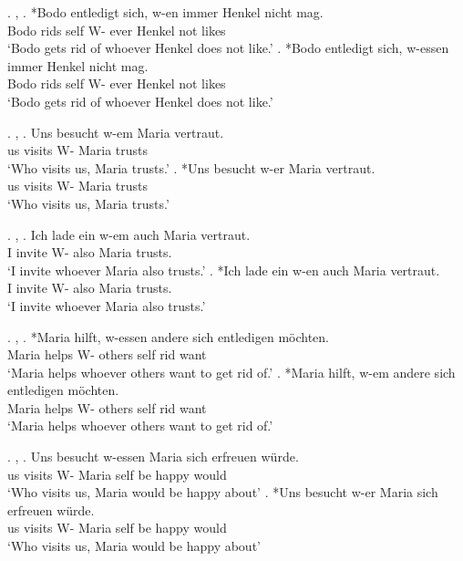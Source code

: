 \ex. , 
\ag. *Bodo entledigt sich, w-en immer Henkel nicht mag.\\
 Bodo rids\scsub{[gen]} self W- ever Henkel not likes\scsub{[acc]}\\
 `Bodo gets rid of whoever Henkel does not like.' \hfill \citep[344]{vogel2001}
\bg. *Bodo entledigt sich, w-essen immer Henkel nicht mag.\\
 Bodo rids\scsub{[gen]} self  W- ever Henkel not likes\scsub{[acc]}\\
 `Bodo gets rid of whoever Henkel does not like.' \hfill \citep[344]{vogel2001}

\ex. , 
\ag. Uns besucht w-em Maria vertraut.\\
 us visits\scsub{[nom]} W- Maria trusts\scsub{[dat]}\\
 `Who visits us, Maria trusts.' \hfill \citep[343]{vogel2001}
\bg. *Uns besucht w-er Maria vertraut.\\
 us visits\scsub{[nom]} W- Maria trusts\scsub{[dat]}\\
 `Who visits us, Maria trusts.' \hfill \citep[343]{vogel2001}

\ex. , 
\ag. Ich {lade ein} w-em auch Maria vertraut. \\
 I invite\scsub{[acc]} W- also Maria trusts\scsub{[dat]}.\\
 `I invite whoever Maria also trusts.' \hfill \citep[344]{vogel2001}
\bg. *Ich {lade ein} w-en auch Maria vertraut. \\
 I invite\scsub{[acc]} W- also Maria trusts\scsub{[dat]}.\\
 `I invite whoever Maria also trusts.' \hfill \citep[344]{vogel2001}

\ex. , 
\ag. *Maria hilft, w-essen andere sich entledigen möchten.\\
 Maria helps\scsub{[dat]} W- others self rid\scsub{[gen]} want\\
 `Maria helps whoever others want to get rid of.' \hfill \citep[344]{vogel2001}
\bg. *Maria hilft, w-em andere sich entledigen möchten.\\
 Maria helps\scsub{[dat]} W- others self rid\scsub{[gen]} want\\
 `Maria helps whoever others want to get rid of.' \hfill \citep[344]{vogel2001}

\ex. , 
\ag. Uns besucht w-essen Maria sich erfreuen würde.\\
 us visits\scsub{[nom]} W- Maria self {be happy}\scsub{[gen]} would\\
 `Who visits us, Maria would be happy about' \hfill \citep[343]{vogel2001}
\bg. *Uns besucht w-er Maria sich erfreuen würde.\\
 us visits\scsub{[nom]} W- Maria self {be happy}\scsub{[gen]} would\\
 `Who visits us, Maria would be happy about' \hfill \citep[343]{vogel2001}

